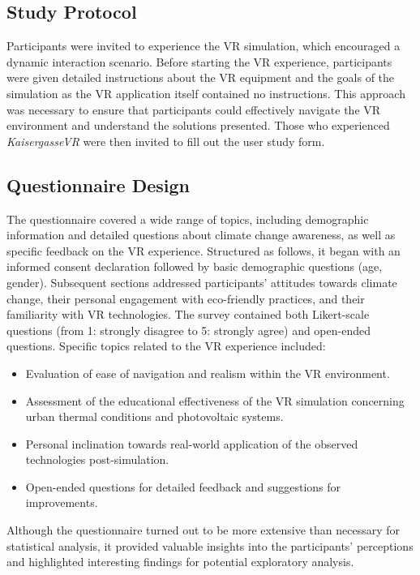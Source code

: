 \documentclass[draft, final]{vutinfth} %
\begin{document}
\subsection{Study Protocol}

 Participants were invited to experience the VR simulation, which encouraged a dynamic interaction scenario. Before starting the VR experience, participants were given detailed instructions about the VR equipment and the goals of the simulation as the VR application itself contained no instructions. This approach was necessary to ensure that participants could effectively navigate the VR environment and understand the solutions presented. Those who experienced \textit{KaisergasseVR} were then invited to fill out the user study form.

\subsection{Questionnaire Design}

The questionnaire covered a wide range of topics, including demographic information and detailed questions about climate change awareness, as well as specific feedback on the VR experience. Structured as follows, it began with an informed consent declaration followed by basic demographic questions (age, gender). Subsequent sections addressed participants' attitudes towards climate change, their personal engagement with eco-friendly practices, and their familiarity with VR technologies. The survey contained both Likert-scale questions (from 1: strongly disagree to 5: strongly agree) and open-ended questions. Specific topics related to the VR experience included:

\begin{itemize}
    \item Evaluation of ease of navigation and realism within the VR environment.
    \item Assessment of the educational effectiveness of the VR simulation concerning urban thermal conditions and photovoltaic systems.
    \item Personal inclination towards real-world application of the observed technologies post-simulation.
    \item Open-ended questions for detailed feedback and suggestions for improvements.
\end{itemize}

Although the questionnaire turned out to be more extensive than necessary for statistical analysis, it provided valuable insights into the participants' perceptions and highlighted interesting findings for potential exploratory analysis.
\end{document}
